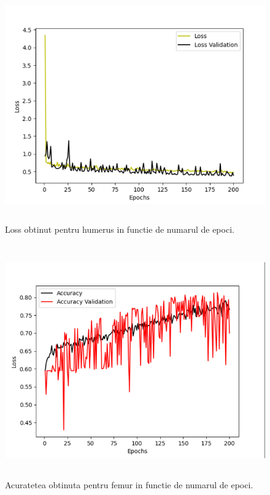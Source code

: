\documentclass[runningheads,a4paper,11pt]{report}
\begin{document}
\begin{figure}[h!]
\centerline{\includegraphics[height=10cm]{Imagini/loss_humerus.png}}
\caption{Loss obtinut pentru humerus in functie de numarul de epoci.}
\label{fig}
\end{figure}

\begin{figure}[h!]
\centerline{\includegraphics[height=10cm]{Imagini/acuratete_femur.png}}
\caption{Acuratetea obtinuta pentru femur in functie de numarul de epoci.}
\label{fig}
\end{figure}
\end{document}
